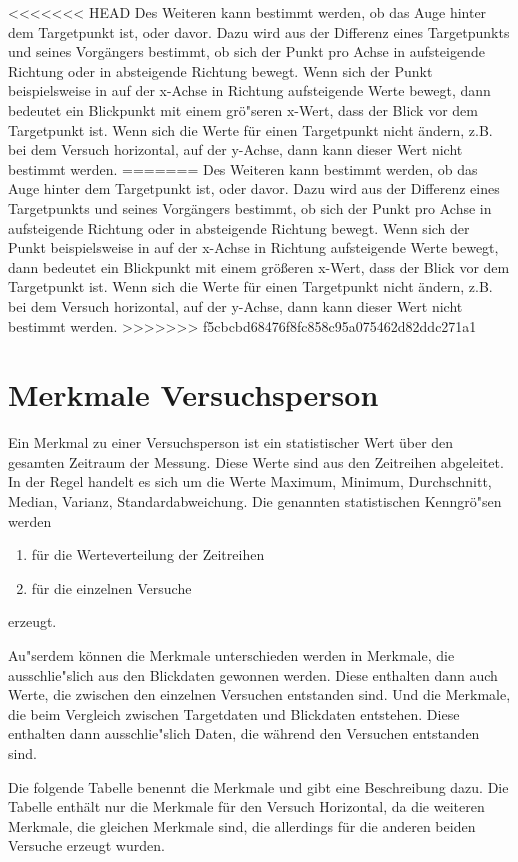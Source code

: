 <<<<<<< HEAD
Des Weiteren kann bestimmt werden, ob das Auge hinter dem Targetpunkt ist, oder davor. Dazu wird aus der Differenz eines Targetpunkts und seines Vorg\"angers bestimmt, ob sich der Punkt pro Achse in aufsteigende Richtung oder in absteigende Richtung bewegt. Wenn sich der Punkt beispielsweise in auf der x-Achse in Richtung aufsteigende Werte bewegt, dann bedeutet ein Blickpunkt mit einem gr\"o"seren x-Wert, dass der Blick vor dem Targetpunkt ist. Wenn sich die Werte f\"ur einen Targetpunkt nicht \"andern, z.B. bei dem Versuch horizontal, auf der y-Achse, dann kann dieser Wert nicht bestimmt werden.
=======
Des Weiteren kann bestimmt werden, ob das Auge hinter dem Targetpunkt ist, oder davor. Dazu wird aus der Differenz eines Targetpunkts und seines Vorg\"angers bestimmt, ob sich der Punkt pro Achse in aufsteigende Richtung oder in absteigende Richtung bewegt. Wenn sich der Punkt beispielsweise in auf der x-Achse in Richtung aufsteigende Werte bewegt, dann bedeutet ein Blickpunkt mit einem gr\"o\ss{}eren x-Wert, dass der Blick vor dem Targetpunkt ist.
Wenn sich die Werte f\"ur einen Targetpunkt nicht \"andern, z.B. bei dem Versuch horizontal, auf der y-Achse, dann kann dieser Wert nicht bestimmt werden.
>>>>>>> f5cbcbd68476f8fc858c95a075462d82ddc271a1

\section{Merkmale Versuchsperson}

Ein Merkmal zu einer Versuchsperson ist ein statistischer Wert \"uber den gesamten Zeitraum der Messung. Diese Werte sind aus den Zeitreihen abgeleitet. In der Regel handelt es sich um die Werte Maximum, Minimum, Durchschnitt, Median, Varianz, Standardabweichung.
Die genannten statistischen Kenngr\"o"sen werden
\begin{enumerate}
	\item f\"ur die Werteverteilung der Zeitreihen
	\item f\"ur die einzelnen Versuche
\end{enumerate}
erzeugt.

Au"serdem k\"onnen die Merkmale unterschieden werden in Merkmale, die ausschlie"slich aus den Blickdaten gewonnen werden. Diese enthalten dann auch Werte, die zwischen den einzelnen Versuchen entstanden sind. Und die Merkmale, die beim Vergleich zwischen Targetdaten und Blickdaten entstehen. Diese enthalten dann ausschlie"slich Daten, die w\"ahrend den Versuchen entstanden sind.

Die folgende Tabelle benennt die Merkmale und gibt eine Beschreibung dazu. Die Tabelle enth\"alt nur die Merkmale f\"ur den Versuch Horizontal, da die weiteren Merkmale, die gleichen Merkmale sind, die allerdings f\"ur die anderen beiden Versuche erzeugt wurden.